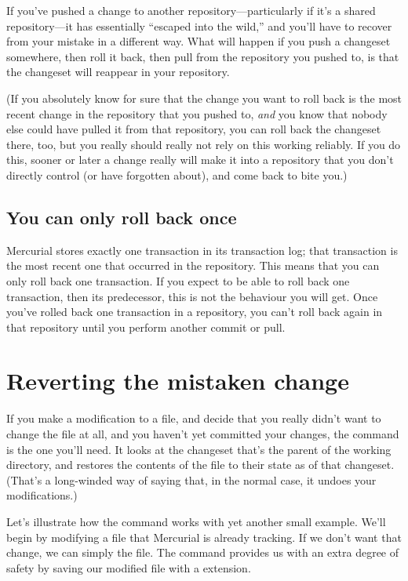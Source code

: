 If you've pushed a change to another repository---particularly if it's
a shared repository---it has essentially ``escaped into the wild,''
and you'll have to recover from your mistake in a different way.  What
will happen if you push a changeset somewhere, then roll it back, then
pull from the repository you pushed to, is that the changeset will
reappear in your repository.

(If you absolutely know for sure that the change you want to roll back
is the most recent change in the repository that you pushed to,
\emph{and} you know that nobody else could have pulled it from that
repository, you can roll back the changeset there, too, but you really
should really not rely on this working reliably.  If you do this,
sooner or later a change really will make it into a repository that
you don't directly control (or have forgotten about), and come back to
bite you.)

\subsection{You can only roll back once}

Mercurial stores exactly one transaction in its transaction log; that
transaction is the most recent one that occurred in the repository.
This means that you can only roll back one transaction.  If you expect
to be able to roll back one transaction, then its predecessor, this is
not the behaviour you will get.
Once you've rolled back one transaction in a repository, you can't
roll back again in that repository until you perform another commit or
pull.

\section{Reverting the mistaken change}

If you make a modification to a file, and decide that you really
didn't want to change the file at all, and you haven't yet committed
your changes, the  command is the one you'll need.  It
looks at the changeset that's the parent of the working directory, and
restores the contents of the file to their state as of that changeset.
(That's a long-winded way of saying that, in the normal case, it
undoes your modifications.)

Let's illustrate how the  command works with yet another
small example.  We'll begin by modifying a file that Mercurial is
already tracking.
If we don't want that change, we can simply  the file.
The  command provides us with an extra degree of safety
by saving our modified file with a  extension.

